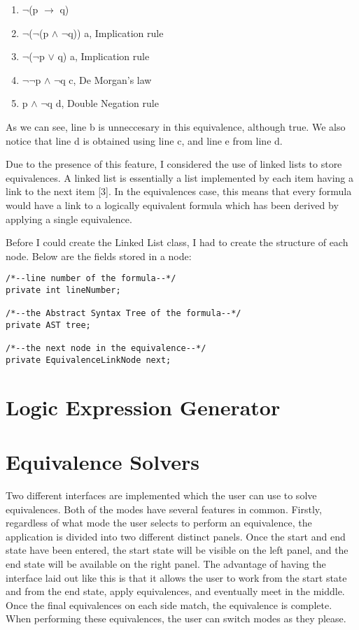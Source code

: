 \documentclass{report}
\begin{document}
\begin{enumerate}
    \item $\neg$(p $\to$ q)
		\item $\neg$($\neg$(p $\land$ $\neg$q)) \hfill a, Implication rule
    \item $\neg$($\neg$p $\lor$ q) \hfill a, Implication rule
    \item $\neg$$\neg$p $\land$ $\neg$q \hfill c, De Morgan's law
    \item p $\land$ $\neg$q \hfill d, Double Negation rule
\end{enumerate}

As we can see, line b is unneccesary in this equivalence, although true.
We also notice that line d is obtained using line c, and line e from line d.

Due to the presence of this feature, I considered the use of linked lists
to store equivalences. A linked list is essentially a list implemented by
each item having a link to the next item [3]. In the equivalences case, this
means that every formula would have a link to a logically equivalent formula
which has been derived by applying a single equivalence.

Before I could create the Linked List class, I had to create the structure of
each node. Below are the fields stored in a node:

\begin{verbatim}
/*--line number of the formula--*/
private int lineNumber;

/*--the Abstract Syntax Tree of the formula--*/
private AST tree;

/*--the next node in the equivalence--*/
private EquivalenceLinkNode next;
\end{verbatim}

\section{Logic Expression Generator}

\section{Equivalence Solvers}

Two different interfaces are implemented which the user can use to solve equivalences.
Both of the modes have several features in common. Firstly, regardless of what mode
the user selects to perform an equivalence, the application is divided into two
different distinct panels. Once the start and end state have been entered, the
start state will be visible on the left panel, and the end state will be available on
the right panel. The advantage of having the interface laid out like this is that
it allows the user to work from the start state and from the end state, apply
equivalences, and eventually meet in the middle. Once the final equivalences on each
side match, the equivalence is complete. When performing these equivalences, the
user can switch modes as they please.
\end{document}
